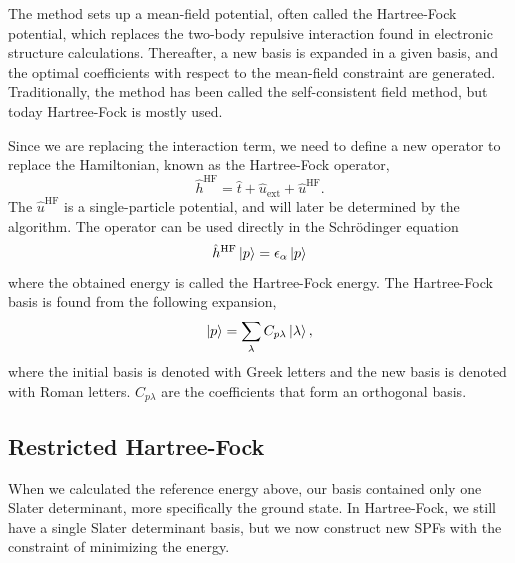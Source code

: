 The method sets up a mean-field potential, often called the Hartree-Fock potential, which replaces the two-body repulsive interaction found in electronic structure calculations. Thereafter, a new basis is expanded in a given basis, and the optimal coefficients with respect to the mean-field constraint are generated. Traditionally, the method has been called the self-consistent field method, but today Hartree-Fock is mostly used. 

Since we are replacing the interaction term, we need to define a new operator to replace the Hamiltonian, known as the Hartree-Fock operator,
\begin{equation}
\hat{h}^{\text{HF}}=\hat{t} + \hat{u}_{\text{ext}} + \hat{u}^{\text{HF}}.
\end{equation}
The $\hat{u}^{\text{HF}}$ is a single-particle potential, and will later be determined by the algorithm. The operator can be used directly in the Schrödinger equation 
\begin{equation}
\hat{h}^{\text{HF}}\ket{p}=\epsilon_{\alpha}\ket{p}
\end{equation}
where the obtained energy is called the Hartree-Fock energy. The Hartree-Fock basis is found from the following expansion,
\begin{equation}
\ket{p}=\sum_{\lambda}C_{p\lambda}\ket{\lambda},
\end{equation}
where the initial basis is denoted with Greek letters and the new basis is denoted with Roman letters. $C_{p\lambda}$ are the coefficients that form an orthogonal basis. 

\subsection{Restricted Hartree-Fock}
When we calculated the reference energy above, our basis contained only one Slater determinant, more specifically the ground state. In Hartree-Fock, we still have a single Slater determinant basis, but we now construct new SPFs with the constraint of minimizing the energy. 

